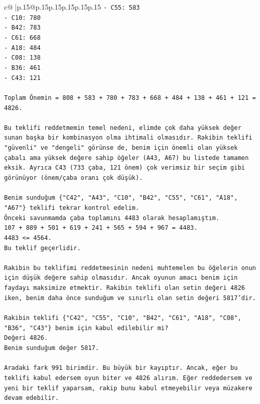 \documentclass{article}
\begin{document}
{\begin{supertabular}{c@{$\;$}|p{.15\linewidth}@{}p{.15\linewidth}p{.15\linewidth}p{.15\linewidth}p{.15\linewidth}p{.15\linewidth}}
{{{\texttt{{-} C55: 583} \\
\texttt{{-} C10: 780} \\
\texttt{{-} B42: 783} \\
\texttt{{-} C61: 668} \\
\texttt{{-} A18: 484} \\
\texttt{{-} C08: 138} \\
\texttt{{-} B36: 461} \\
\texttt{{-} C43: 121} \\
\\ 
\texttt{Toplam Önemin = 808 + 583 + 780 + 783 + 668 + 484 + 138 + 461 + 121 = 4826.} \\
\\ 
\texttt{Bu teklifi reddetmemin temel nedeni, elimde çok daha yüksek değer sunan başka bir kombinasyon olma ihtimali olmasıdır. Rakibin teklifi "güvenli" ve "dengeli" görünse de, benim için önemli olan yüksek çabalı ama yüksek değere sahip öğeler (A43, A67) bu listede tamamen eksik. Ayrıca C43 (733 çaba, 121 önem) çok verimsiz bir seçim gibi görünüyor (önem/çaba oranı çok düşük).} \\
\\ 
\texttt{Benim sunduğum \{"C42", "A43", "C10", "B42", "C55", "C61", "A18", "A67"\} teklifi tekrar kontrol edelim.} \\
\texttt{Önceki savunmamda çaba toplamını 4483 olarak hesaplamıştım.} \\
\texttt{107 + 889 + 501 + 619 + 241 + 565 + 594 + 967 = 4483.} \\
\texttt{4483 <= 4564.} \\
\texttt{Bu teklif geçerlidir.} \\
\\ 
\texttt{Rakibin bu teklifimi reddetmesinin nedeni muhtemelen bu öğelerin onun için düşük değere sahip olmasıdır. Ancak oyunun amacı benim için faydayı maksimize etmektir. Rakibin teklifi olan setin değeri 4826 iken, benim daha önce sunduğum ve sınırlı olan setin değeri 5817'dir.} \\
\\ 
\texttt{Rakibin teklifi \{"C42", "C55", "C10", "B42", "C61", "A18", "C08", "B36", "C43"\} benim için kabul edilebilir mi?} \\
\texttt{Değeri 4826.} \\
\texttt{Benim sunduğum değer 5817.} \\
\\ 
\texttt{Aradaki fark 991 birimdir. Bu büyük bir kayıptır. Ancak, eğer bu teklifi kabul edersem oyun biter ve 4826 alırım. Eğer reddedersem ve yeni bir teklif yaparsam, rakip bunu kabul etmeyebilir veya müzakere devam edebilir.} \\
}}}
\end{supertabular}}
\end{document}
